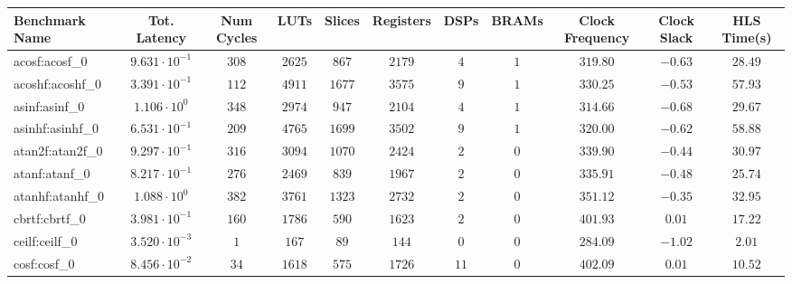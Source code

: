 \begin{tabular}{|l|c|c|c|c|c|c|c|c|c|c|}
\hline
Benchmark Name               & Tot. Latency            & Num Cycles & LUTs      & Slices    & Registers & DSPs    & BRAMs & Clock Frequency & Clock Slack & HLS Time(s) \\
\hline
acosf:acosf\_0               & $ 9.631 \cdot 10^{-1} $ & $ 308    $ & $ 2625  $ & $ 867   $ & $ 2179  $ & $ 4   $ & $ 1 $ & $ 319.80      $ & $ -0.63   $ & $ 28.49   $ \\
acoshf:acoshf\_0             & $ 3.391 \cdot 10^{-1} $ & $ 112    $ & $ 4911  $ & $ 1677  $ & $ 3575  $ & $ 9   $ & $ 1 $ & $ 330.25      $ & $ -0.53   $ & $ 57.93   $ \\
asinf:asinf\_0               & $ 1.106 \cdot 10^{0}  $ & $ 348    $ & $ 2974  $ & $ 947   $ & $ 2104  $ & $ 4   $ & $ 1 $ & $ 314.66      $ & $ -0.68   $ & $ 29.67   $ \\
asinhf:asinhf\_0             & $ 6.531 \cdot 10^{-1} $ & $ 209    $ & $ 4765  $ & $ 1699  $ & $ 3502  $ & $ 9   $ & $ 1 $ & $ 320.00      $ & $ -0.62   $ & $ 58.88   $ \\
atan2f:atan2f\_0             & $ 9.297 \cdot 10^{-1} $ & $ 316    $ & $ 3094  $ & $ 1070  $ & $ 2424  $ & $ 2   $ & $ 0 $ & $ 339.90      $ & $ -0.44   $ & $ 30.97   $ \\
atanf:atanf\_0               & $ 8.217 \cdot 10^{-1} $ & $ 276    $ & $ 2469  $ & $ 839   $ & $ 1967  $ & $ 2   $ & $ 0 $ & $ 335.91      $ & $ -0.48   $ & $ 25.74   $ \\
atanhf:atanhf\_0             & $ 1.088 \cdot 10^{0}  $ & $ 382    $ & $ 3761  $ & $ 1323  $ & $ 2732  $ & $ 2   $ & $ 0 $ & $ 351.12      $ & $ -0.35   $ & $ 32.95   $ \\
cbrtf:cbrtf\_0               & $ 3.981 \cdot 10^{-1} $ & $ 160    $ & $ 1786  $ & $ 590   $ & $ 1623  $ & $ 2   $ & $ 0 $ & $ 401.93      $ & $ 0.01    $ & $ 17.22   $ \\
ceilf:ceilf\_0               & $ 3.520 \cdot 10^{-3} $ & $ 1      $ & $ 167   $ & $ 89    $ & $ 144   $ & $ 0   $ & $ 0 $ & $ 284.09      $ & $ -1.02   $ & $ 2.01    $ \\
cosf:cosf\_0                 & $ 8.456 \cdot 10^{-2} $ & $ 34     $ & $ 1618  $ & $ 575   $ & $ 1726  $ & $ 11  $ & $ 0 $ & $ 402.09      $ & $ 0.01    $ & $ 10.52   $ \\

\end{tabular}
